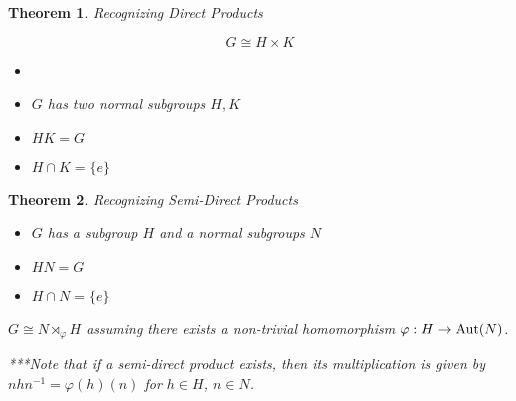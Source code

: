 \documentclass[12pt]{Qual}
\newtheorem{theorem}{Theorem}
\begin{document}
\vspace{0.5cm}
\begin{theorem}{\Large\textit{Recognizing Direct Products}}

\vspace{0.25cm}
\begin{minipage}{0.3\textwidth}
$$G\cong H\times K$$
\end{minipage}\hspace{-0.65cm}\boxed{\iff}\hspace{0.5cm}\begin{minipage}{0.7\textwidth}
\begin{itemize}
\renewcommand\labelitemi{\faPuzzlePiece}
    \item
    \item $G$ has two normal subgroups $H,K$
    \item $HK=G$
    \item $H\cap K=\{e\}$
\end{itemize}
\end{minipage}

\end{theorem}
\vspace{-1cm}
\begin{theorem}{\Large\textit{Recognizing Semi-Direct Products}}

\vspace{-0.5cm}

\begin{itemize}[leftmargin=2.5cm]
\renewcommand\labelitemi{\faPuzzlePiece}
    \item $G$ has a subgroup $H$ and a normal subgroups $N$
    \item $HN=G$
    \item $H\cap N=\{e\}$
\end{itemize}

  \begin{minipage}{0.85\textwidth}
\vspace{0.45cm}
$G\cong N\rtimes_\varphi H$ assuming there exists a non-trivial homomorphism $\varphi:H\to\text{Aut}(N)$.
\end{minipage}

\begin{mybox}
***Note that if a semi-direct product exists, then its multiplication is given by $nhn^{-1}=\varphi(h)(n)$ for $h\in H$, $n\in N$.
\end{mybox}

\end{theorem}
\end{document}
